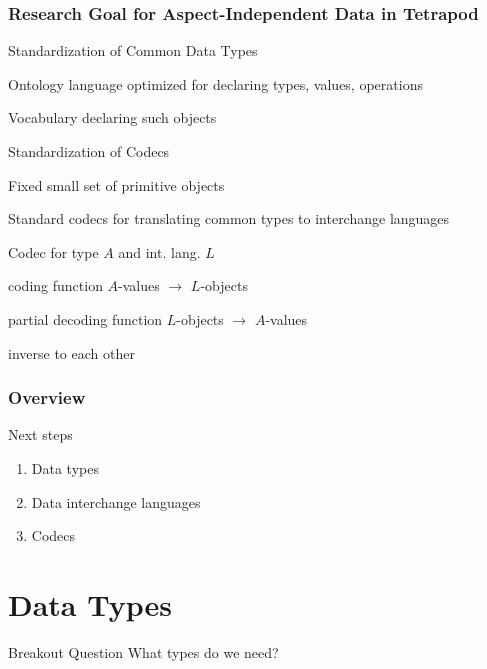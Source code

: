 \documentclass{beamer}
\begin{document}
\begin{frame}\frametitle{Research Goal for Aspect-Independent Data in Tetrapod}
\begin{blockitems}{Standardization of Common Data Types}
 \item Ontology language optimized for declaring types, values, operations
 \item Vocabulary declaring such objects
\end{blockitems}

\begin{blockitems}{Standardization of Codecs}
\item Fixed small set of primitive objects
\item Standard codecs for translating common types to interchange languages
\end{blockitems}

\begin{blockitems}{Codec for type $A$ and int. lang. $L$}
\item coding function $A$-values $\to$ $L$-objects
\item partial decoding function $L$-objects $\to$ $A$-values
\item inverse to each other 
\end{blockitems}
\end{frame}

\begin{frame}\frametitle{Overview}
Next steps
\begin{enumerate}
\item Data types
\item Data interchange languages
\item Codecs
\end{enumerate}
\end{frame}

\section{Data Types}

\begin{frame}{Breakout Question}
What types do we need?
\end{frame}
\end{document}
